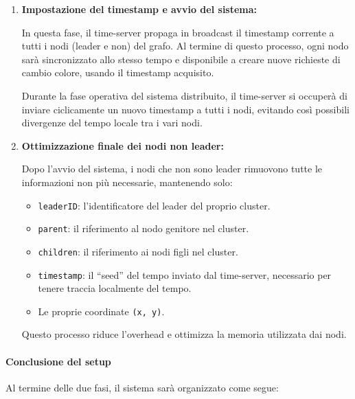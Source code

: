 \documentclass[12pt, a4paper]{report}
\begin{document}
\begin{enumerate}
    \item \textbf{Impostazione del timestamp e avvio del sistema:}

    In questa fase, il time-server propaga in broadcast il timestamp corrente a tutti i nodi (leader e non) del grafo. Al termine di questo processo, ogni nodo sar\`a sincronizzato allo stesso tempo e disponibile a creare nuove richieste di cambio colore, usando il timestamp acquisito.
    
    Durante la fase operativa del sistema distribuito, il time-server si occuper\`a di inviare ciclicamente un nuovo timestamp a tutti i nodi, evitando cos\`i possibili divergenze del tempo locale tra i vari nodi.

    \item \textbf{Ottimizzazione finale dei nodi non leader:}

    Dopo l'avvio del sistema, i nodi che non sono leader rimuovono tutte le informazioni non pi\`u necessarie, mantenendo solo:
    \begin{itemize}
        \item \texttt{leaderID}: l'identificatore del leader del proprio cluster.
        \item \texttt{parent}: il riferimento al nodo genitore nel cluster.
        \item \texttt{children}: il riferimento ai nodi figli nel cluster.
        \item \texttt{timestamp}: il ``seed'' del tempo inviato dal time-server, necessario per tenere traccia localmente del tempo.
        \item Le proprie coordinate \texttt{(x, y)}.
    \end{itemize}

    Questo processo riduce l'overhead e ottimizza la memoria utilizzata dai nodi.

\end{enumerate}

\paragraph{Conclusione del setup}

Al termine delle due fasi, il sistema sar\`a organizzato come segue:
\end{document}
